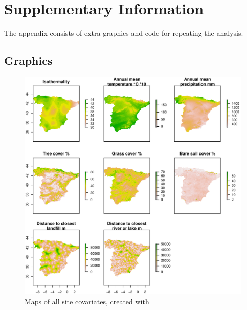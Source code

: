 \documentclass[12pt]{scrartcl} %
\title{\vspace{-2cm}{\Large Actual and future predicted occupancy \\ of the Black Kite in Spain  \\ \small - Case study of the course Monitoring and occupancy modelling - }}
\author{Felix Nößler \\  \small  2$^{nd}$ semester in master program: Ecology, Evolution and Conservation (M.Sc.), \\ \small Registration number: 810578}
\date{{\large \today}}
\begin{document}


\maketitle
\onehalfspacing



\printbibliography

\newpage
\section*{Supplementary Information}

The appendix consists of extra graphics and code for repeating the analysis. 

\subsection*{Graphics}
\begin{figure}[H]
	\centering
	\includegraphics[width=\linewidth]{img/site_covs}
	\caption{Maps of all site covariates, created with \textcite{raster}}
	\label{fig:site_cov_maps}
\end{figure}
\end{document}
